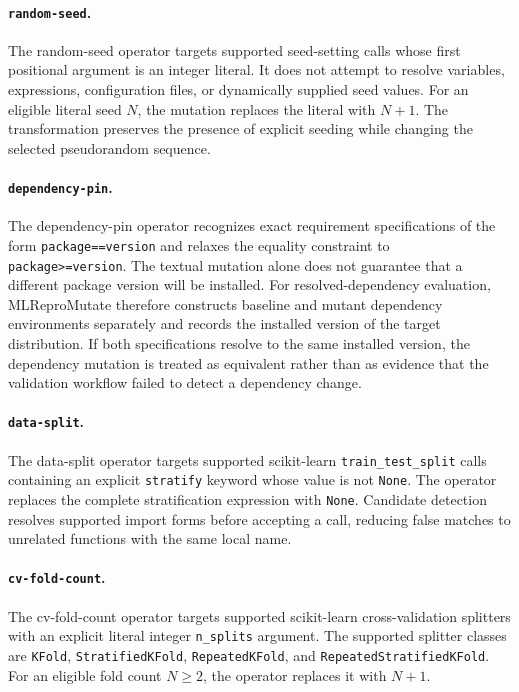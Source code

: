 \paragraph{\texttt{random-seed}.}
The random-seed operator targets supported seed-setting calls whose first
positional argument is an integer literal. It does not attempt to resolve
variables, expressions, configuration files, or dynamically supplied seed
values. For an eligible literal seed $N$, the mutation replaces the literal
with $N+1$. The transformation preserves the presence of explicit seeding while
changing the selected pseudorandom sequence.

\paragraph{\texttt{dependency-pin}.}
The dependency-pin operator recognizes exact requirement specifications of the
form \texttt{package==version} and relaxes the equality constraint to
\texttt{package>=version}. The textual mutation alone does not guarantee that a
different package version will be installed. For resolved-dependency
evaluation, MLReproMutate therefore constructs baseline and mutant dependency
environments separately and records the installed version of the target
distribution. If both specifications resolve to the same installed version,
the dependency mutation is treated as equivalent rather than as evidence that
the validation workflow failed to detect a dependency change.

\paragraph{\texttt{data-split}.}
The data-split operator targets supported scikit-learn
\texttt{train\_test\_split} calls containing an explicit
\texttt{stratify} keyword whose value is not \texttt{None}. The operator
replaces the complete stratification expression with \texttt{None}. Candidate
detection resolves supported import forms before accepting a call, reducing
false matches to unrelated functions with the same local name.

\paragraph{\texttt{cv-fold-count}.}
The cv-fold-count operator targets supported scikit-learn cross-validation
splitters with an explicit literal integer \texttt{n\_splits} argument. The
supported splitter classes are \texttt{KFold},
\texttt{StratifiedKFold}, \texttt{RepeatedKFold}, and
\texttt{RepeatedStratifiedKFold}. For an eligible fold count $N \geq 2$, the
operator replaces it with $N+1$.


